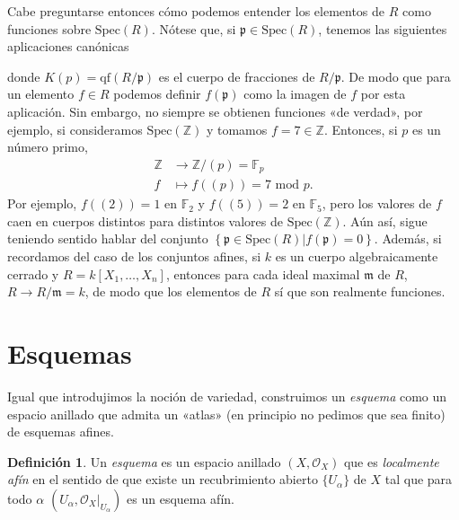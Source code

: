 \documentclass[12pt,a4paper]{article}
\theoremstyle{definition} \newtheorem{defn}[thm]{Definición}
\theoremstyle{definition} \newtheorem{ejemplo}[thm]{Ejemplo}
\theoremstyle{definition} \newtheorem{ejercicio}[thm]{Ejercicio}
\theoremstyle{remark} \newtheorem*{obs}{Observación}
\def\sp{\mathrm{Spec}}
\def\pp{\mathfrak{p}}
\def\ZZ{\mathbb{Z}}
\def\OO{\mathscr{O}}
\def\mm{\mathfrak{m}}
\begin{document}
	Cabe preguntarse entonces cómo podemos entender los elementos de $R$ como funciones sobre $\sp(R)$. Nótese que, si $\pp \in \sp(R)$, tenemos las siguientes aplicaciones canónicas
	\begin{center}
	\end{center}
	donde $K(p)=\mathrm{qf}(R/\pp)$ es el cuerpo de fracciones de $R/\pp$. De modo que para un elemento $f\in R$ podemos definir $f(\pp)$ como la imagen de $f$ por esta aplicación. Sin embargo, no siempre se obtienen funciones «de verdad», por ejemplo, si consideramos $\sp(\ZZ)$ y tomamos $f=7\in \ZZ$. Entonces, si $p$ es un número primo,
	\begin{align*}
	  \ZZ&\longrightarrow \ZZ/(p)=\mathbb{F}_p\\ 
	  f &\longmapsto f\left( (p) \right)=7 \text{ mod } p. 
	  \end{align*}
	  Por ejemplo, $f\left( (2) \right)= 1$ en $\mathbb{F}_2$ y $f( (5) )=2$ en $\mathbb{F}_5$, pero los valores de $f$ caen en cuerpos distintos para distintos valores de $\sp(\ZZ)$. Aún así, sigue teniendo sentido hablar del conjunto $\left\{ \pp \in \sp(R) | f(\pp)=0 \right\}$. Además, si recordamos del caso de los conjuntos afines, si $k$ es un cuerpo algebraicamente cerrado y $R=k[X_1,\dots,X_n]$, entonces para cada ideal maximal $\mm$ de $R$, $R\rightarrow R/\mm =k$, de modo que los elementos de $R$ sí que son realmente funciones.
      
	  \section{Esquemas}
	  Igual que introdujimos la noción de variedad, construimos un \emph{esquema} como un espacio anillado que admita un «atlas» (en principio no pedimos que sea finito) de esquemas afines.
	  \begin{defn}
	    Un \emph{esquema} es un espacio anillado $(X,\OO_X)$ que es \emph{localmente afín} en el sentido de que existe un recubrimiento abierto $\{U_{\alpha}\}$ de $X$ tal que para todo $\alpha$ $(U_{\alpha}, \OO_X|_{U_{\alpha}})$ es un esquema afín.
	  \end{defn}
\end{document}
